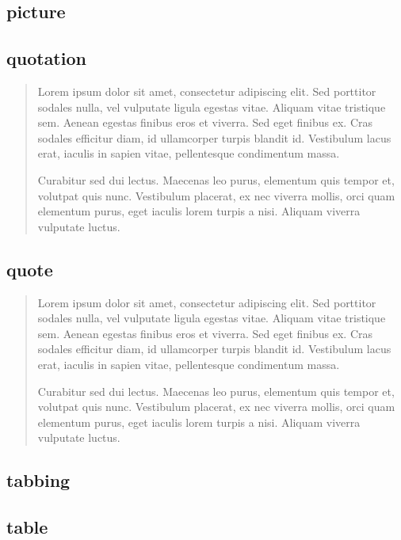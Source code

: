 \documentclass[11pt]{article}
\begin{document}
\subsection{picture} %

\subsection{quotation}
\begin{quotation}
    Lorem ipsum dolor sit amet, consectetur adipiscing elit. Sed porttitor sodales nulla, vel vulputate ligula egestas vitae. Aliquam vitae tristique sem. Aenean egestas finibus eros et viverra. Sed eget finibus ex. Cras sodales efficitur diam, id ullamcorper turpis blandit id. Vestibulum lacus erat, iaculis in sapien vitae, pellentesque condimentum massa.
    
    Curabitur sed dui lectus. Maecenas leo purus, elementum quis tempor et, volutpat quis nunc. Vestibulum placerat, ex nec viverra mollis, orci quam elementum purus, eget iaculis lorem turpis a nisi. Aliquam viverra vulputate luctus.
\end{quotation}

\subsection{quote}
\begin{quote}
    Lorem ipsum dolor sit amet, consectetur adipiscing elit. Sed porttitor sodales nulla, vel vulputate ligula egestas vitae. Aliquam vitae tristique sem. Aenean egestas finibus eros et viverra. Sed eget finibus ex. Cras sodales efficitur diam, id ullamcorper turpis blandit id. Vestibulum lacus erat, iaculis in sapien vitae, pellentesque condimentum massa.
    
    Curabitur sed dui lectus. Maecenas leo purus, elementum quis tempor et, volutpat quis nunc. Vestibulum placerat, ex nec viverra mollis, orci quam elementum purus, eget iaculis lorem turpis a nisi. Aliquam viverra vulputate luctus.
\end{quote}

\subsection{tabbing} %

\subsection{table} %
\end{document}
